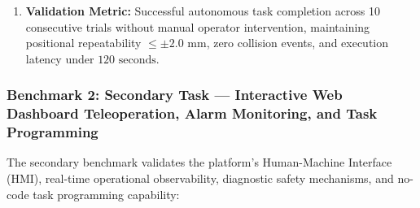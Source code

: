 \begin{enumerate}[leftmargin=1.5em]
  \item \textbf{Validation Metric:} Successful autonomous task completion across 10 consecutive trials without manual operator intervention, maintaining positional repeatability $\le \pm 2.0\text{ mm}$, zero collision events, and execution latency under $120\text{ seconds}$.
\end{enumerate}

\subsubsection{Benchmark 2: Secondary Task --- Interactive Web Dashboard Teleoperation, Alarm Monitoring, and Task Programming}
The secondary benchmark validates the platform's Human-Machine Interface (HMI), real-time operational observability, diagnostic safety mechanisms, and no-code task programming capability:

